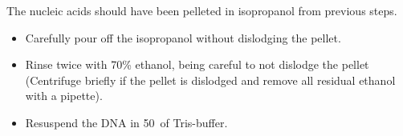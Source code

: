 The nucleic acids should have been pelleted in isopropanol from previous steps.
\begin{itemize}
\item Carefully pour off the isopropanol without dislodging the pellet. 
\item Rinse twice with 70\% ethanol, being careful to not dislodge the pellet (Centrifuge briefly if the pellet is dislodged and remove all residual ethanol with a pipette).
\item Resuspend the DNA in 50~\uL of Tris-buffer.
\end{itemize}




